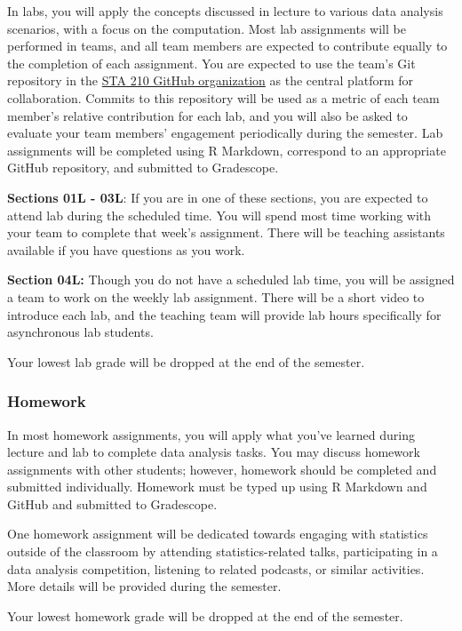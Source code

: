 \documentclass[
]{article}
\begin{document}
In labs, you will apply the concepts discussed in lecture to various
data analysis scenarios, with a focus on the computation. Most lab
assignments will be performed in teams, and all team members are
expected to contribute equally to the completion of each assignment. You
are expected to use the team's Git repository in the
\href{https://github.com/sta210-sp21}{STA 210 GitHub organization} as
the central platform for collaboration. Commits to this repository will
be used as a metric of each team member's relative contribution for each
lab, and you will also be asked to evaluate your team members'
engagement periodically during the semester. Lab assignments will be
completed using R Markdown, correspond to an appropriate GitHub
repository, and submitted to Gradescope.

\textbf{Sections 01L - 03L}: If you are in one of these sections, you
are expected to attend lab during the scheduled time. You will spend
most time working with your team to complete that week's assignment.
There will be teaching assistants available if you have questions as you
work.

\textbf{Section 04L:} Though you do not have a scheduled lab time, you
will be assigned a team to work on the weekly lab assignment. There will
be a short video to introduce each lab, and the teaching team will
provide lab hours specifically for asynchronous lab students.

Your lowest lab grade will be dropped at the end of the semester.

\hypertarget{homework}{%
\subsubsection{Homework}\label{homework}}

In most homework assignments, you will apply what you've learned during
lecture and lab to complete data analysis tasks. You may discuss
homework assignments with other students; however, homework should be
completed and submitted individually. Homework must be typed up using R
Markdown and GitHub and submitted to Gradescope.

One homework assignment will be dedicated towards engaging with
statistics outside of the classroom by attending statistics-related
talks, participating in a data analysis competition, listening to
related podcasts, or similar activities. More details will be provided
during the semester.

Your lowest homework grade will be dropped at the end of the semester.
\end{document}
